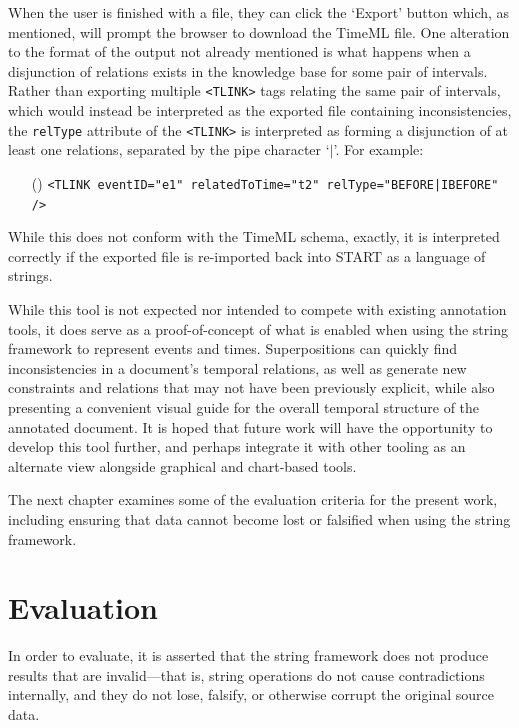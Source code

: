 \documentclass[a4paper,12pt,leqno]{article}
\newcommand{\ipp}{(\refstepcounter{equation}\theequation)}
\begin{document}
When the user is finished with a file, they can click the `Export' button which, as mentioned, will prompt the browser to download the TimeML file. One alteration to the format of the output not already mentioned is what happens when a disjunction of relations exists in the knowledge base for some pair of intervals. Rather than exporting multiple \verb|<TLINK>| tags relating the same pair of intervals, which would instead be interpreted as the exported file containing inconsistencies, the \verb|relType| attribute of the \verb|<TLINK>| is interpreted as forming a disjunction of at least one relations, separated by the pipe character `$|$'. For example:
\begin{itemize}
	\item[\ipp] \verb!<TLINK eventID="e1" relatedToTime="t2" relType="BEFORE|IBEFORE" />!
\end{itemize}
While this does not conform with the TimeML schema, exactly, it is interpreted correctly if the exported file is re-imported back into START as a language of strings.

While this tool is not expected nor intended to compete with existing annotation tools, it does serve as a proof-of-concept of what is enabled when using the string framework to represent events and times. Superpositions can quickly find inconsistencies in a document's temporal relations, as well as generate new constraints and relations that may not have been previously explicit, while also presenting a convenient visual guide for the overall temporal structure of the annotated document. It is hoped that future work will have the opportunity to develop this tool further, and perhaps integrate it with other tooling as an alternate view alongside graphical and chart-based tools.

The next chapter examines some of the evaluation criteria for the present work, including ensuring that data cannot become lost or falsified when using the string framework.%

\newpage
\section{Evaluation}\label{sec:evaluation}
In order to evaluate, it is asserted that the string framework does not produce results that are invalid---that is, string operations do not cause contradictions internally, and they do not lose, falsify, or otherwise corrupt the original source data.%
\end{document}
